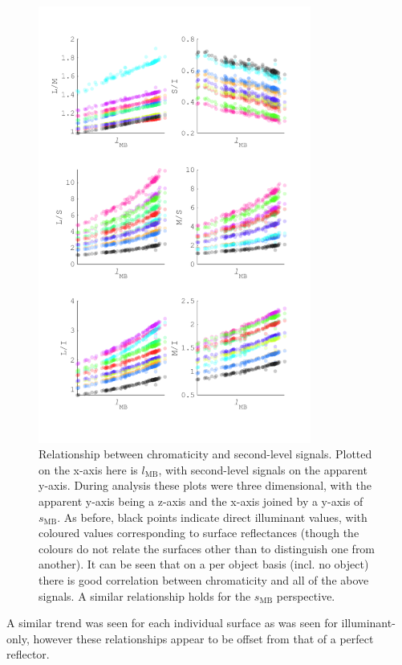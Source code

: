 \begin{figure}
\includegraphics[max width=0.8\textwidth]{figs/comp/predictingChromaticity/allComboSignals.pdf}
\caption{Relationship between chromaticity and second-level signals. Plotted on the x-axis here is $l_{\text{MB}}$, with second-level signals on the apparent y-axis. During analysis these plots were three dimensional, with the apparent y-axis being a z-axis and the x-axis joined by a y-axis of $s_{\text{MB}}$. As before, black points indicate direct illuminant values, with coloured values corresponding to surface reflectances (though the colours do not relate the surfaces other than to distinguish one from another). It can be seen that on a per object basis (incl. no object) there is good correlation between chromaticity and all of the above signals. A similar relationship holds for the $s_{\text{MB}}$ perspective.}
\label{fig:allComboSignals}
\end{figure}

A similar trend was seen for each individual surface as was seen for illuminant-only, however these relationships appear to be offset from that of a perfect reflector.

